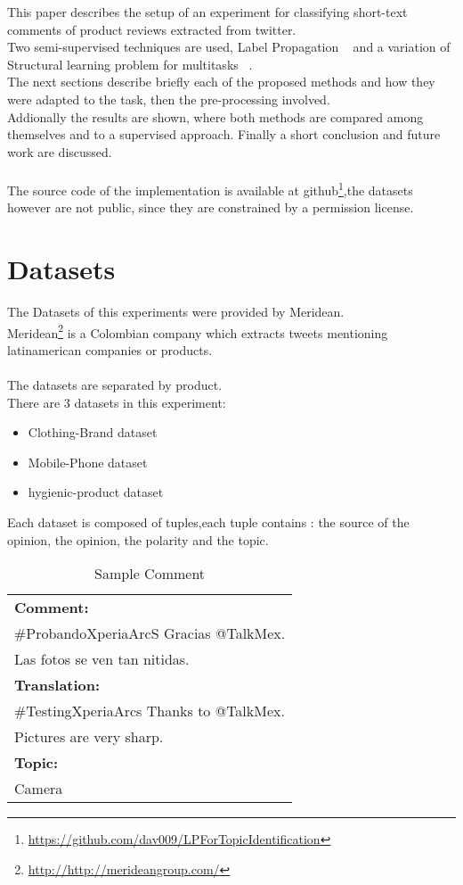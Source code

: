 \documentclass[4pt,a4paper,twocolumn]{article}
\begin{document}
This paper describes the setup of an experiment for classifying short-text comments of product reviews extracted from twitter.\\
Two semi-supervised techniques are used, Label Propagation ~\cite{Zhu:2005:SLG:1104523}  and  a variation of Structural learning problem for multitasks ~\cite{Ando:2005:FLP:1046920.1194905}.\\
The next sections describe briefly each of the proposed methods and how they were adapted to the task, then the pre-processing involved. \\
Addionally the results are shown, where both methods are compared among themselves and to a supervised approach.
Finally a short conclusion and future work are discussed.\\
\\
The source code of the implementation is available at github\footnote{\url{https://github.com/dav009/LPForTopicIdentification}},the datasets however are not public, since they are constrained by a permission license.

\section{Datasets}
The Datasets of this experiments were provided by Meridean.\\
Meridean\footnote{\url{http://http://merideangroup.com/}} is a Colombian company which extracts tweets
mentioning latinamerican companies or products.\\
\\
The datasets are separated by product.\\
There are 3 datasets in this experiment:
\begin{itemize}
	\item Clothing-Brand dataset
	\item Mobile-Phone dataset
	\item hygienic-product dataset
\end{itemize}

Each dataset is composed of tuples,each tuple contains : the source of the opinion, the opinion, the polarity and the topic.\\

\begin{table}[h]
\centering
\begin{tabular}{| l |}
\hline
\textbf{Comment:}\\
$\#$ProbandoXperiaArcS Gracias @TalkMex.\\
Las fotos se ven tan nitidas.\\
\hline
\textbf{Translation:}\\
$\#$TestingXperiaArcs Thanks to @TalkMex.\\
Pictures are very sharp.\\
\hline
\textbf{Topic:}\\
Camera\\
\hline
\end{tabular}
\caption{Sample Comment}
\label{tab:sampleTuple}
\end{table}
\end{document}
